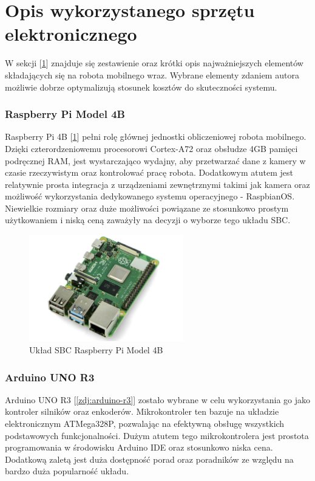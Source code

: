 \section{Opis wykorzystanego sprzętu elektronicznego}
\label{sek:opis-sprzetu}
W sekcji [\ref{sek:opis-sprzetu}] znajduje się zestawienie oraz krótki opis najważniejszych elementów składających się na robota mobilnego wraz. Wybrane elementy zdaniem autora możliwie dobrze optymalizują stosunek kosztów do skuteczności systemu. 

\subsubsection*{Raspberry Pi Model 4B}
Raspberry Pi 4B [\ref{zdj:raspi}] pełni rolę głównej jednostki obliczeniowej robota mobilnego. Dzięki czterordzeniowemu procesorowi Cortex-A72 oraz obsłudze 4GB pamięci podręcznej RAM, jest wystarczająco wydajny, aby przetwarzać dane z kamery w czasie rzeczywistym oraz kontrolować pracę robota. Dodatkowym atutem jest relatywnie prosta integracja z urządzeniami zewnętrznymi takimi jak kamera oraz możliwość wykorzystania dedykowanego systemu operacyjnego - RaspbianOS. Niewielkie rozmiary oraz duże możliwości powiązane ze stosunkowo prostym użytkowaniem i niską ceną zaważyły na decyzji o wyborze tego układu SBC. 

\begin{figure}[H]
    \centering
    \includegraphics[width=0.6\textwidth]{./graf/raspi-4b.png}
    \caption{Układ SBC Raspberry Pi Model 4B}
    \label{zdj:raspi}
\end{figure}

\subsubsection*{Arduino UNO R3}
Arduino UNO R3 [\ref{zdj:arduino-r3}] zostało wybrane w celu wykorzystania go jako kontroler silników oraz enkoderów. Mikrokontroler ten bazuje na układzie elektronicznym ATMega328P, pozwalając na efektywną obsługę wszystkich podstawowych funkcjonalności. Dużym atutem tego mikrokontrolera jest prostota programowania w środowisku Arduino IDE oraz stosunkowo niska cena. Dodatkową zaletą jest duża dostępność porad oraz poradników ze względu na bardzo duża popularność układu. 

